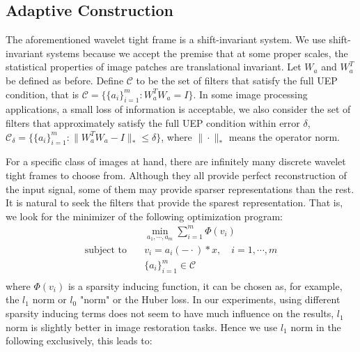 \documentclass[a4paper]{article}
\begin{document}
\subsection{Adaptive Construction}
The aforementioned wavelet tight frame is a shift-invariant system. We use shift-invariant systems because we accept the premise that at some proper scales, the statistical properties of image patches are translational invariant. Let $W_a$ and $W_a^T$ be defined as before. Define $\mathcal{C}$ to be the set of filters that satisfy the full UEP condition, that is $\mathcal{C}=\{ \{a_i\}_{i=1}^m : W_a^TW_a=I\}$. In some image processing applications, a small loss of information is acceptable, we also consider the set of filters that approximately satisfy the full UEP condition within error $\delta$, $\mathcal{C}_\delta = \{\{a_i\}_{i=1}^m : \|W_a^TW_a -I\|_*\leq \delta\}$, where $\| \cdot \|_*$ means the operator norm.

For a specific class of images at hand, there are infinitely many discrete wavelet tight frames to choose from. Although they all provide perfect reconstruction of the input signal, some of them may provide sparser representations than the rest. It is natural to seek the filters that provide the sparest representation. That is, we look for the minimizer of the following optimization program:
\begin{equation}
\begin{aligned}
	&\min_{a_1,\cdots,a_m} \sum_{i=1}^m\Phi(v_i)\\
	\textrm{subject to} \quad &v_i = a_i(-\cdot)*x,\quad i=1,\cdots,m\\
	  &\{a_i\}_{i=1}^m \in \mathcal{C} \\
\end{aligned}
\end{equation}
where $\Phi(v_i)$ is a sparsity inducing function, it can be chosen as, for example, the $l_1$ norm or $l_0$ "norm" or the Huber loss. In our experiments, using different sparsity inducing terms does not seem to have much influence on the results, $l_1$ norm is slightly better in image restoration tasks. Hence we use $l_1$ norm in the following exclusively, this leads to:
\end{document}
